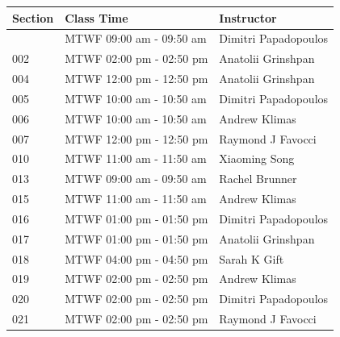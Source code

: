 \begin{longtable}[]{@{}lll@{}}
\toprule\noalign{}
Section & Class Time & Instructor \\
\midrule\noalign{}
\endhead
\bottomrule\noalign{}
\endlastfoot
001 & MTWF 09:00 am - 09:50 am & Dimitri Papadopoulos \\
002 & MTWF 02:00 pm - 02:50 pm & Anatolii Grinshpan \\
004 & MTWF 12:00 pm - 12:50 pm & Anatolii Grinshpan \\
005 & MTWF 10:00 am - 10:50 am & Dimitri Papadopoulos \\
006 & MTWF 10:00 am - 10:50 am & Andrew Klimas \\
007 & MTWF 12:00 pm - 12:50 pm & Raymond J Favocci \\
010 & MTWF 11:00 am - 11:50 am & Xiaoming Song \\
013 & MTWF 09:00 am - 09:50 am & Rachel Brunner \\
015 & MTWF 11:00 am - 11:50 am & Andrew Klimas \\
016 & MTWF 01:00 pm - 01:50 pm & Dimitri Papadopoulos \\
017 & MTWF 01:00 pm - 01:50 pm & Anatolii Grinshpan \\
018 & MTWF 04:00 pm - 04:50 pm & Sarah K Gift \\
019 & MTWF 02:00 pm - 02:50 pm & Andrew Klimas \\
020 & MTWF 02:00 pm - 02:50 pm & Dimitri Papadopoulos \\
021 & MTWF 02:00 pm - 02:50 pm & Raymond J Favocci \\
\end{longtable}
